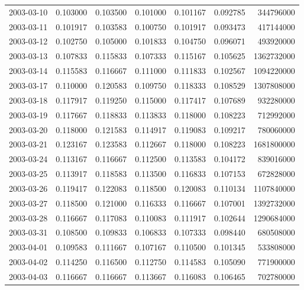 \begin{tabular}{lrrrrrr}
2003-03-10 &    0.103000 &    0.103500 &    0.101000 &    0.101167 &    0.092785 &   344796000 \\
2003-03-11 &    0.101917 &    0.103583 &    0.100750 &    0.101917 &    0.093473 &   417144000 \\
2003-03-12 &    0.102750 &    0.105000 &    0.101833 &    0.104750 &    0.096071 &   493920000 \\
2003-03-13 &    0.107833 &    0.115833 &    0.107333 &    0.115167 &    0.105625 &  1362732000 \\
2003-03-14 &    0.115583 &    0.116667 &    0.111000 &    0.111833 &    0.102567 &  1094220000 \\
2003-03-17 &    0.110000 &    0.120583 &    0.109750 &    0.118333 &    0.108529 &  1307808000 \\
2003-03-18 &    0.117917 &    0.119250 &    0.115000 &    0.117417 &    0.107689 &   932280000 \\
2003-03-19 &    0.117667 &    0.118833 &    0.113833 &    0.118000 &    0.108223 &   712992000 \\
2003-03-20 &    0.118000 &    0.121583 &    0.114917 &    0.119083 &    0.109217 &   780060000 \\
2003-03-21 &    0.123167 &    0.123583 &    0.112667 &    0.118000 &    0.108223 &  1681800000 \\
2003-03-24 &    0.113167 &    0.116667 &    0.112500 &    0.113583 &    0.104172 &   839016000 \\
2003-03-25 &    0.113917 &    0.118583 &    0.113500 &    0.116833 &    0.107153 &   672828000 \\
2003-03-26 &    0.119417 &    0.122083 &    0.118500 &    0.120083 &    0.110134 &  1107840000 \\
2003-03-27 &    0.118500 &    0.121000 &    0.116333 &    0.116667 &    0.107001 &  1392732000 \\
2003-03-28 &    0.116667 &    0.117083 &    0.110083 &    0.111917 &    0.102644 &  1290684000 \\
2003-03-31 &    0.108500 &    0.109833 &    0.106833 &    0.107333 &    0.098440 &   680508000 \\
2003-04-01 &    0.109583 &    0.111667 &    0.107167 &    0.110500 &    0.101345 &   533808000 \\
2003-04-02 &    0.114250 &    0.116500 &    0.112750 &    0.114583 &    0.105090 &   771900000 \\
2003-04-03 &    0.116667 &    0.116667 &    0.113667 &    0.116083 &    0.106465 &   702780000 \\

\end{tabular}
